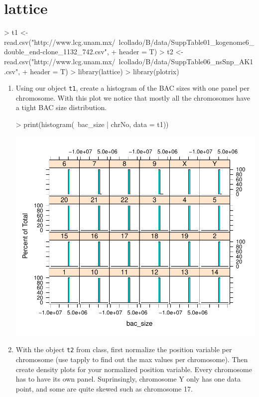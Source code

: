 \documentclass[letterpaper,12pt]{article}
\newcommand{\pl}[1]{\texttt{#1}}
\begin{document}
\section{lattice}
\begin{Schunk}
\begin{Sinput}
> t1 <- read.csv("http://www.lcg.unam.mx/~lcollado/B/data/SuppTable01_kogenome6_double_end-clone_1132_742.csv", 
+     header = T)
> t2 <- read.csv("http://www.lcg.unam.mx/~lcollado/B/data/SuppTable06_nsSnp_AK1.csv", 
+     header = T)
> library(lattice)
> library(plotrix)
\end{Sinput}
\end{Schunk}
  \begin{enumerate}
  \item Using our object \pl{t1}, create a histogram of the BAC sizes with one panel per chromosome. With this plot we notice that mostly all the chromosomes have a tight BAC size distribution.
\begin{Schunk}
\begin{Sinput}
> print(histogram(~bac_size | chrNo, data = t1))
\end{Sinput}
\end{Schunk}
\includegraphics{plots/fig-002}
  \item With the object \pl{t2} from class, first normalize the position variable per chromosome (use tapply to find out the max values per chromosome). Then create density plots for your normalized position variable. Every chromosome has to have its own panel. Suprinsingly, chromosome Y only has one data point, and some are quite skewed such as chromosome 17.

\end{enumerate}
\end{document}
